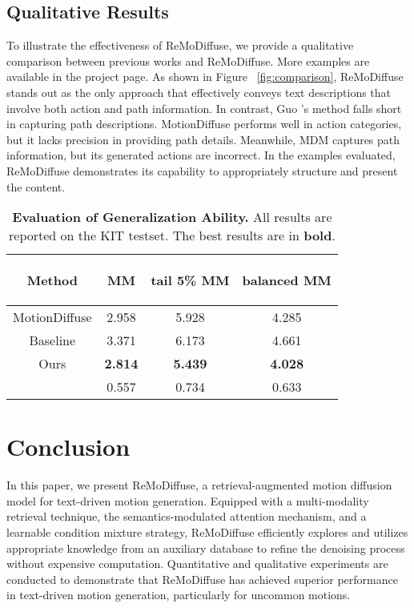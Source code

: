 \documentclass[10pt,twocolumn,letterpaper]{article}
\newcommand{\name}{ReMoDiffuse\xspace}
\begin{document}
\subsection{Qualitative Results}
\label{sec:qualitative}
To illustrate the effectiveness of \name, we provide a qualitative comparison between previous works and \name. More examples are available in the project page. As shown in Figure ~\ref{fig:comparison}, \name stands out as the only approach that effectively conveys text descriptions that involve both action and path information. In contrast, Guo \etal's method falls short in capturing path descriptions. MotionDiffuse performs well in action categories, but it lacks precision in providing path details. Meanwhile, MDM captures path information, but its generated actions are incorrect. In the examples evaluated, \name demonstrates its capability to appropriately structure and present the content.



\begin{table}[t]
\centering
\small
\caption{\textbf{Evaluation of Generalization Ability.} All results are reported on the KIT testset. The best results are in \textbf{bold}.}
\label{tab:few_shot}
\setlength{\tabcolsep}{1.4mm}
{
\begin{tabular}{cccc}
\hline\textbf{}

Method & MM  & tail 5\% MM  & balanced MM \\
\hline
MotionDiffuse & 2.958 & 5.928 & 4.285 \\
\hline
Baseline & 3.371 & 6.173 & 4.661 \\
Ours & \textbf{2.814} & \textbf{5.439} & \textbf{4.028} \\
 & 0.557 & 0.734 & 0.633 \\
\hline
\end{tabular}}
\vspace{-10pt}
\end{table}












 \section{Conclusion}

In this paper, we present \name, a retrieval-augmented motion diffusion model for text-driven motion generation. Equipped with a multi-modality retrieval technique, the semantics-modulated attention mechanism, and a learnable condition mixture strategy, \name efficiently explores and utilizes appropriate knowledge from an auxiliary database to refine the denoising process without expensive computation. Quantitative and qualitative experiments are conducted to demonstrate that \name has achieved superior performance in text-driven motion generation, particularly for uncommon motions. 
\end{document}
